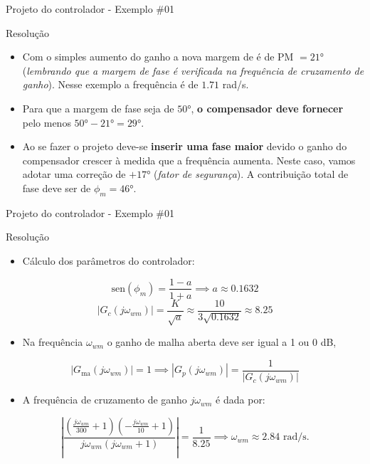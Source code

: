 \begin{frame}{Projeto do controlador - Exemplo \#01}
    \begin{block}{Resolução}
    \begin{itemize}
        \item Com o simples aumento do ganho a nova margem de é de PM $= \ang{21}$ (\textit{lembrando que a margem de fase é verificada na frequência de cruzamento de ganho}). Nesse exemplo a frequência é de $\num{1,71}$ rad/s.
        \item Para que a margem de fase seja de $\ang{50}$, \textbf{o compensador deve fornecer} pelo menos $\ang{50} - \ang{21} = \ang{29}$.
        \item Ao se fazer o projeto deve-se \textbf{inserir uma fase maior} devido o ganho do compensador crescer à medida que a frequência aumenta. Neste caso, vamos adotar uma correção de $+\ang{17}$ (\textit{fator de segurança}). A contribuição total de fase deve ser de $\phi_m = \ang{46}$.
    \end{itemize}
\end{block}
\end{frame}

\begin{frame}{Projeto do controlador - Exemplo \#01}
\begin{block}{Resolução}
\begin{itemize}
    \item Cálculo dos parâmetros do controlador:
\end{itemize}
\begin{equation*}
    \text{sen}(\phi_m) = \dfrac{1 - a}{1 + a} \implies a \approx \num{0,1632}
\end{equation*}
\begin{equation*}
    \left|G_c(j\omega_{wm})\right| = \dfrac{K}{\sqrt{a}} \approx \dfrac{10}{3\sqrt{\num{0,1632}}} \approx \num{8,25}
\end{equation*}
\vspace{-0.1cm}
\begin{itemize}
    \item Na frequência $\omega_{wm}$ o ganho de malha aberta deve ser igual a 1 ou 0 dB,
\end{itemize}
\begin{equation*}
    \left|G_{\text{ma}}(j\omega_{wm})\right| = 1 \implies \left|G_{p}(j\omega_{wm})\right| = \dfrac{1}{\left|G_{c}(j\omega_{wm})\right|}
\end{equation*}
\vspace{-0.3cm}
\begin{itemize}
    \item A frequência de cruzamento de ganho $j\omega_{wm}$ é dada por:
\end{itemize}
\begin{equation*}
    \left|\dfrac{\left(\frac{j\omega_{wm}}{300} + 1\right) \left(-\frac{j\omega_{wm}}{10} + 1\right)}{j\omega_{wm}(j\omega_{wm} + 1)}\right| = \dfrac{1}{\num{8,25}} \implies \omega_{wm} \approx \num{2,84} \text{ rad/s}.
\end{equation*}
\end{block}
\end{frame}

